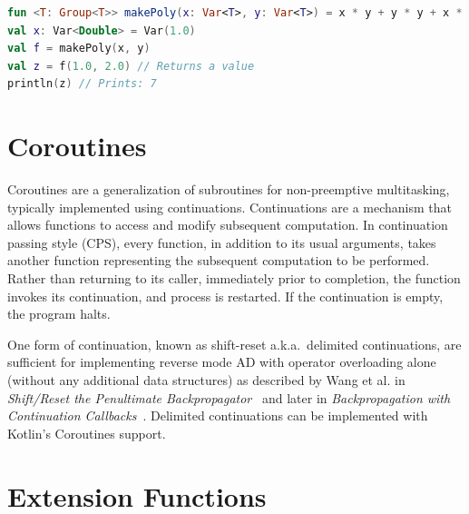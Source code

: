 \documentclass[12pt,initial,twoside,maitrise]{dms}
\numberwithin{equation}{section}
\numberwithin{table}{chapter}
\numberwithin{figure}{chapter}
\begin{document}
\begin{lstlisting}[language=Kotlin]
fun <T: Group<T>> makePoly(x: Var<T>, y: Var<T>) = x * y + y * y + x * x
val x: Var<Double> = Var(1.0)
val f = makePoly(x, y)
val z = f(1.0, 2.0) // Returns a value
println(z) // Prints: 7
\end{lstlisting}


\section{Coroutines}\label{sec:coroutines}

Coroutines are a generalization of subroutines for non-preemptive multitasking, typically implemented using continuations. Continuations are a mechanism that allows functions to access and modify subsequent computation. In continuation passing style (CPS), every function, in addition to its usual arguments, takes another function representing the subsequent computation to be performed. Rather than returning to its caller, immediately prior to completion, the function invokes its continuation, and process is restarted. If the continuation is empty, the program halts.

One form of continuation, known as shift-reset a.k.a.\ delimited continuations, are sufficient for implementing reverse mode AD with operator overloading alone (without any additional data structures) as described by Wang et al. in \textit{Shift/Reset the Penultimate Backpropagator}~\cite{wang2018demystifying} and later in \textit{Backpropagation with Continuation Callbacks}~\cite{wang2018backpropagation}. Delimited continuations can be implemented with Kotlin's Coroutines support.

\section{Extension Functions}\label{sec:extension-functions}
\end{document}

